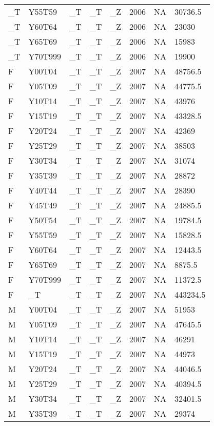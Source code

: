 \begin{longtable}[t]{llllllll}
\addlinespace
\_T & Y55T59 & \_T & \_T & \_Z & 2006 & NA & 30736.5\\
\_T & Y60T64 & \_T & \_T & \_Z & 2006 & NA & 23030\\
\_T & Y65T69 & \_T & \_T & \_Z & 2006 & NA & 15983\\
\_T & Y70T999 & \_T & \_T & \_Z & 2006 & NA & 19900\\
F & Y00T04 & \_T & \_T & \_Z & 2007 & NA & 48756.5\\
\addlinespace
F & Y05T09 & \_T & \_T & \_Z & 2007 & NA & 44775.5\\
F & Y10T14 & \_T & \_T & \_Z & 2007 & NA & 43976\\
F & Y15T19 & \_T & \_T & \_Z & 2007 & NA & 43328.5\\
F & Y20T24 & \_T & \_T & \_Z & 2007 & NA & 42369\\
F & Y25T29 & \_T & \_T & \_Z & 2007 & NA & 38503\\
\addlinespace
F & Y30T34 & \_T & \_T & \_Z & 2007 & NA & 31074\\
F & Y35T39 & \_T & \_T & \_Z & 2007 & NA & 28872\\
F & Y40T44 & \_T & \_T & \_Z & 2007 & NA & 28390\\
F & Y45T49 & \_T & \_T & \_Z & 2007 & NA & 24885.5\\
F & Y50T54 & \_T & \_T & \_Z & 2007 & NA & 19784.5\\
\addlinespace
F & Y55T59 & \_T & \_T & \_Z & 2007 & NA & 15828.5\\
F & Y60T64 & \_T & \_T & \_Z & 2007 & NA & 12443.5\\
F & Y65T69 & \_T & \_T & \_Z & 2007 & NA & 8875.5\\
F & Y70T999 & \_T & \_T & \_Z & 2007 & NA & 11372.5\\
F & \_T & \_T & \_T & \_Z & 2007 & NA & 443234.5\\
\addlinespace
M & Y00T04 & \_T & \_T & \_Z & 2007 & NA & 51953\\
M & Y05T09 & \_T & \_T & \_Z & 2007 & NA & 47645.5\\
M & Y10T14 & \_T & \_T & \_Z & 2007 & NA & 46291\\
M & Y15T19 & \_T & \_T & \_Z & 2007 & NA & 44973\\
M & Y20T24 & \_T & \_T & \_Z & 2007 & NA & 44046.5\\
\addlinespace
M & Y25T29 & \_T & \_T & \_Z & 2007 & NA & 40394.5\\
M & Y30T34 & \_T & \_T & \_Z & 2007 & NA & 32401.5\\
M & Y35T39 & \_T & \_T & \_Z & 2007 & NA & 29374\\

\end{longtable}
